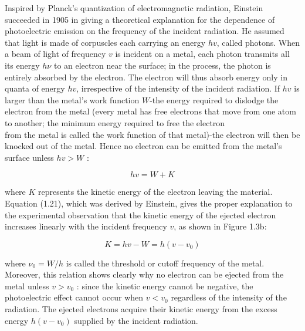 \documentclass[10pt]{article}
\begin{document}
Inspired by Planck's quantization of electromagnetic radiation, Einstein succeeded in 1905 in giving a theoretical explanation for the dependence of photoelectric emission on the frequency of the incident radiation. He assumed that light is made of corpuscles each carrying an energy $h v$, called photons. When a beam of light of frequency $v$ is incident on a metal, each photon transmits all its energy $h \nu$ to an electron near the surface; in the process, the photon is entirely absorbed by the electron. The electron will thus absorb energy only in quanta of energy $h v$, irrespective of the intensity of the incident radiation. If $h v$ is larger than the metal's work function $W$-the energy required to dislodge the electron from the metal (every metal has free electrons that move from one atom to another; the minimum energy required to free the electron\\
from the metal is called the work function of that metal)-the electron will then be knocked out of the metal. Hence no electron can be emitted from the metal's surface unless $h v>W$ :


\begin{equation*}
h v=W+K \tag{1.21}
\end{equation*}


where $K$ represents the kinetic energy of the electron leaving the material.\\
Equation (1.21), which was derived by Einstein, gives the proper explanation to the experimental observation that the kinetic energy of the ejected electron increases linearly with the incident frequency $v$, as shown in Figure 1.3b:


\begin{equation*}
K=h v-W=h\left(v-v_{0}\right) \tag{1.22}
\end{equation*}


where $\nu_{0}=W / h$ is called the threshold or cutoff frequency of the metal. Moreover, this relation shows clearly why no electron can be ejected from the metal unless $v>v_{0}$ : since the kinetic energy cannot be negative, the photoelectric effect cannot occur when $v<v_{0}$ regardless of the intensity of the radiation. The ejected electrons acquire their kinetic energy from the excess energy $h\left(v-v_{0}\right)$ supplied by the incident radiation.
\end{document}
